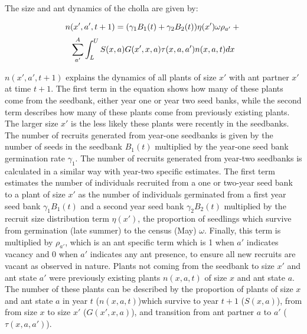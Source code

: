 \documentclass[11pt]{article}
\begin{document}
The size and ant dynamics of the cholla are given by:
		
	\begin{linenomath*}
		$$
		n(x',a',t+1) = (\gamma_1 B_1(t) + \gamma_2 B_2(t)) \eta(x') \omega \rho_{a'}  + \\
		$$
		$$
		\sum_{a'}^{A} \int_L^U S(x,a) G(x',x,a) \tau(x,a,a') n(x,a,t) dx \\
		$$
	\end{linenomath*}
	
$n(x',a',t+1)$  explains the dynamics of all plants of size $x'$ with ant partner $x'$ at time $t+1$. 
The first term in the equation shows how many of these plants come from the seedbank, either year one or year two seed banks, while the second term describes how many of these plants come from previously existing plants. 
The larger size $x'$ is the less likely these plants were recently in the seedbanks. 
The number of recruits generated from year-one seedbanks is given by the number of seeds in the seedbank $B_1(t)$ multiplied by the year-one seed bank germination rate $\gamma_1$.
The number of recruits generated from year-two seedbanks is calculated in a similar way with year-two specific estimates. 
The first term estimates the number of individuals recruited from a one or two-year seed bank to a plant of size $x'$ as the number of individuals germinated from a first year seed bank $\gamma_1 B_1(t)$ and a second year seed bank $\gamma_2 B_2(t)$ multiplied by the recruit size distribution term $\eta(x')$, the proportion of seedlings which survive from germination (late summer) to the census (May) $\omega$.
Finally, this term is multiplied by $\rho_{a'}$, which is an ant specific term which is 1 when $a'$ indicates vacancy and 0 when $a'$ indicates any ant presence, to ensure all new recruits are vacant as observed in nature. 
Plants not coming from the seedbank to size $x'$ and ant state $a'$ were previously existing plants $n(x,a,t)$ of size $x$ and ant state $a$.
The number of these plants can be described by the proportion of plants of size $x$ and ant state $a$ in year $t$ ($n(x,a,t)$)which survive to year $t+1$ ($S(x,a)$), from from size $x$ to size $x'$ ($G(x',x,a)$), and transition from ant partner $a$ to $a'$ ($\tau(x,a,a')$).
\end{document}
